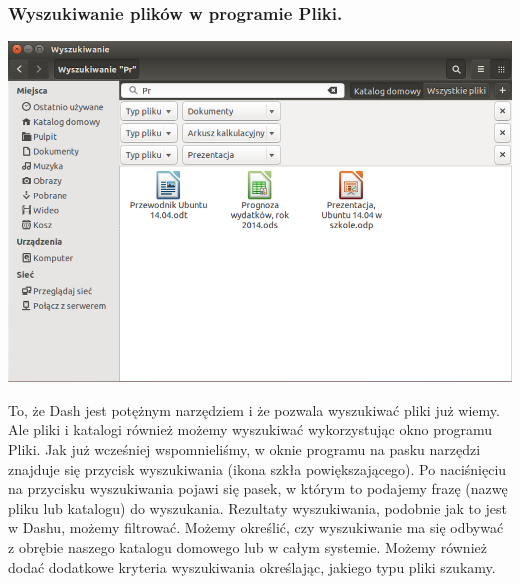 \subsubsection{Wyszukiwanie plików w programie Pliki.}
\begin{center}
	\includegraphics[width=\linewidth]{images/programy_nautilus2.png}
\end{center}

To, że Dash jest potężnym narzędziem i że pozwala wyszukiwać pliki już wiemy. Ale pliki i katalogi również możemy wyszukiwać wykorzystując okno programu Pliki. Jak już wcześniej wspomnieliśmy, w oknie programu na pasku narzędzi znajduje się przycisk wyszukiwania (ikona szkła powiększającego). Po naciśnięciu na przycisku wyszukiwania pojawi się pasek, w którym to podajemy frazę (nazwę pliku lub katalogu) do wyszukania. Rezultaty wyszukiwania, podobnie jak to jest w Dashu, możemy filtrować. Możemy określić, czy wyszukiwanie ma się odbywać z obrębie naszego katalogu domowego lub w całym systemie. Możemy również dodać dodatkowe kryteria wyszukiwania określając, jakiego typu pliki szukamy.

